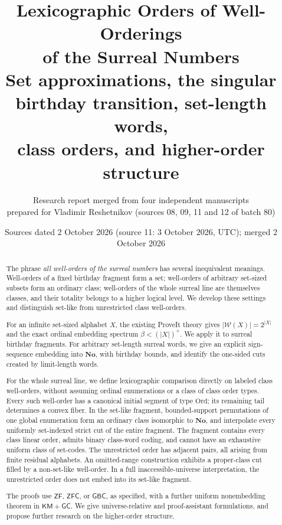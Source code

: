 \documentclass[11pt]{article}
\title{\color{navy}\bfseries Lexicographic Orders of Well-Orderings\\
of the Surreal Numbers\\[5pt]
\large Set approximations, the singular birthday transition, set-length words,\\
class orders, and higher-order structure}
\author{Research report merged from four independent manuscripts\\
prepared for Vladimir Reshetnikov (sources 08, 09, 11 and 12 of batch 80)}
\date{Sources dated 2 October 2026 (source 11: 3 October 2026, UTC); merged 2 October 2026}
\theoremstyle{definition}
\theoremstyle{remark}
\newcommand{\No}{\mathbf{No}}
\newcommand{\Ord}{\mathrm{Ord}}
\newcommand{\WO}{\mathcal W}
\newcommand{\GBC}{\mathsf{GBC}}
\newcommand{\ZFC}{\mathsf{ZFC}}
\newcommand{\ZF}{\mathsf{ZF}}
\newcommand{\KM}{\mathsf{KM}}
\newcommand{\GC}{\mathsf{GC}}
\newcommand{\card}[1]{\lvert #1\rvert}
\begin{document}
\maketitle
\thispagestyle{empty}
\begin{abstract}

The phrase \emph{all well-orders of the surreal numbers} has several
inequivalent meanings. Well-orders of a fixed birthday fragment form a set;
well-orders of arbitrary set-sized subsets form an ordinary class;
well-orders of the whole surreal line are themselves classes, and their
totality belongs to a higher logical level. We develop these settings and
distinguish set-like from unrestricted class well-orders.

For an infinite set-sized alphabet \(X\), the existing ProveIt theory gives
\(\card{\WO(X)}=2^{\card X}\) and the exact ordinal embedding spectrum
\(\beta<(\card X)^+\). We apply it to surreal birthday fragments. For
arbitrary set-length surreal words, we give an explicit sign-sequence
embedding into \(\No\), with birthday bounds, and identify the
one-sided cuts created by limit-length words.

For the whole surreal line, we define lexicographic comparison directly on
labeled class well-orders, without assuming ordinal enumerations or a class
of class order types. Every such well-order has a canonical initial segment
of type \(\Ord\); its remaining tail determines a convex fiber. In the
set-like fragment, bounded-support permutations of one global enumeration
form an ordinary class isomorphic to \(\No\), and interpolate every
uniformly set-indexed strict cut of the entire fragment. The fragment
contains every class linear order, admits binary class-word coding, and
cannot have an exhaustive uniform class of set-codes. The unrestricted
order has adjacent pairs, all arising from finite residual alphabets.
An omitted-range construction exhibits a proper-class cut filled by a
non-set-like well-order. In a full inaccessible-universe interpretation,
the unrestricted order does not embed into its set-like fragment.

The proofs use \(\ZF\), \(\ZFC\), or \(\GBC\), as specified, with
a further uniform nonembedding theorem in \(\KM+\GC\). We give
universe-relative and proof-assistant formulations, and propose further
research on the higher-order structure.



\end{abstract}
\end{document}
